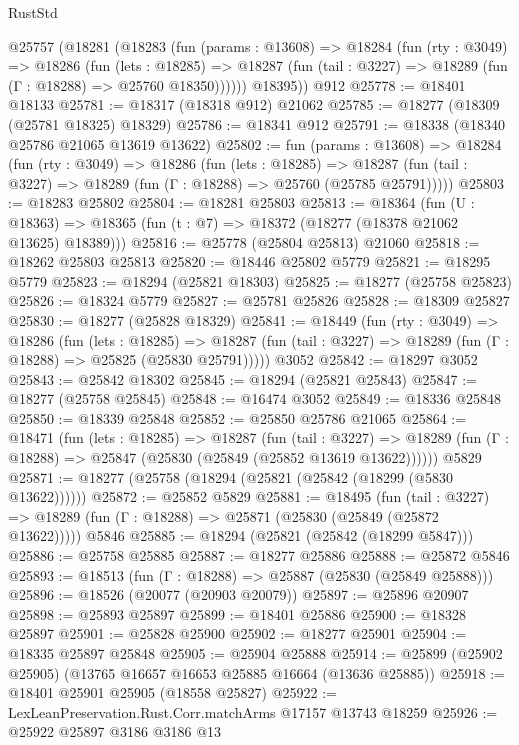 \begin{lexlean}{RustStd}
\begin{coremodule}
    @25757
      (@18281
        (@18283
          (fun (params : @13608) =>
          @18284
            (fun (rty : @3049) =>
            @18286
              (fun (lets : @18285) =>
              @18287 (fun (tail : @3227) => @18289 (fun (Γ : @18288) => @25760 @18350))))))
        @18395))
    @912
@25778 := @18401 @18133
@25781 := @18317 (@18318 @912) @21062
@25785 := @18277 (@18309 (@25781 @18325) @18329)
@25786 := @18341 @912
@25791 := @18338 (@18340 @25786 @21065 @13619 @13622)
@25802 := fun (params : @13608) =>
  @18284
    (fun (rty : @3049) =>
    @18286
      (fun (lets : @18285) =>
      @18287 (fun (tail : @3227) => @18289 (fun (Γ : @18288) => @25760 (@25785 @25791)))))
@25803 := @18283 @25802
@25804 := @18281 @25803
@25813 := @18364
    (fun (U : @18363) => @18365 (fun (t : @7) => @18372 (@18277 (@18378 @21062 @13625) @18389)))
@25816 := @25778 (@25804 @25813) @21060
@25818 := @18262 @25803 @25813
@25820 := @18446 @25802 @5779
@25821 := @18295 @5779
@25823 := @18294 (@25821 @18303)
@25825 := @18277 (@25758 @25823)
@25826 := @18324 @5779
@25827 := @25781 @25826
@25828 := @18309 @25827
@25830 := @18277 (@25828 @18329)
@25841 := @18449
    (fun (rty : @3049) =>
    @18286
      (fun (lets : @18285) =>
      @18287 (fun (tail : @3227) => @18289 (fun (Γ : @18288) => @25825 (@25830 @25791)))))
    @3052
@25842 := @18297 @3052
@25843 := @25842 @18302
@25845 := @18294 (@25821 @25843)
@25847 := @18277 (@25758 @25845)
@25848 := @16474 @3052
@25849 := @18336 @25848
@25850 := @18339 @25848
@25852 := @25850 @25786 @21065
@25864 := @18471
    (fun (lets : @18285) =>
    @18287
      (fun (tail : @3227) =>
      @18289 (fun (Γ : @18288) => @25847 (@25830 (@25849 (@25852 @13619 @13622))))))
    @5829
@25871 := @18277 (@25758 (@18294 (@25821 (@25842 (@18299 (@5830 @13622))))))
@25872 := @25852 @5829
@25881 := @18495
    (fun (tail : @3227) => @18289 (fun (Γ : @18288) => @25871 (@25830 (@25849 (@25872 @13622)))))
    @5846
@25885 := @18294 (@25821 (@25842 (@18299 @5847)))
@25886 := @25758 @25885
@25887 := @18277 @25886
@25888 := @25872 @5846
@25893 := @18513 (fun (Γ : @18288) => @25887 (@25830 (@25849 @25888)))
@25896 := @18526 (@20077 (@20903 @20079))
@25897 := @25896 @20907
@25898 := @25893 @25897
@25899 := @18401 @25886
@25900 := @18328 @25897
@25901 := @25828 @25900
@25902 := @18277 @25901
@25904 := @18335 @25897 @25848
@25905 := @25904 @25888
@25914 := @25899 (@25902 @25905) (@13765 @16657 @16653 @25885 @16664 (@13636 @25885))
@25918 := @18401 @25901 @25905 (@18558 @25827)
@25922 := LexLeanPreservation.Rust.Corr.matchArms @17157 @13743 @18259
@25926 := @25922 @25897 @3186 @3186 @13

\end{coremodule}
\end{lexlean}
